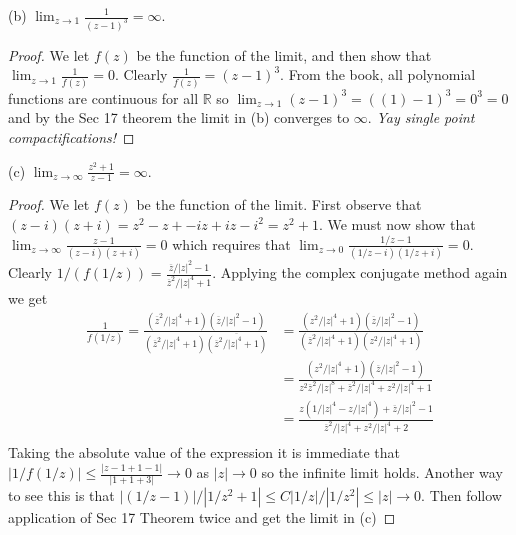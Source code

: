 \documentclass[11pt]{amsart}
\theoremstyle{definition}
\numberwithin{theorem}{section}
\numberwithin{definition}{section}
\numberwithin{equation}{section}
\begin{document}
\noindent (b) $\lim_{z \to 1} \frac{1}{(z-1)^3} = \infty$.
\begin{proof}
  We let $f(z)$ be the function of the limit, and then show that $\lim_{z \to 1} \frac{1}{f(z)} = 0.$ Clearly $\frac{1}{f(z)} = (z-1)^3$. From the book, all polynomial functions are continuous for all $\mathbb{R}$ so $\lim_{z \to 1}(z-1)^3 = ((1)-1)^3 = 0^3 = 0$ and by the Sec 17 theorem the limit in (b) converges to $\infty.$ \emph{Yay single point compactifications!}
\end{proof}


\noindent (c) $\lim_{z \to \infty} \frac{z^2 + 1}{z-1} = \infty$.
\begin{proof}
  We let $f(z)$ be the function of the limit. First observe that $(z-i)(z+i) = z^2 - z + -iz +iz -i^2 = z^2 + 1$. We must now show that $\lim_{z \to \infty} \frac{z-1}{(z-i)(z+i)} = 0$ which requires that $\lim_{z \to 0}\frac{1/z -1}{(1/z-i)(1/z + i)} =0$. Clearly $1/(f(1/z)) = \frac{\overline{z}/|z|^2 - 1}{\overline{z}^2/|z|^4 + 1}.$ Applying the complex conjugate method again we get
  \begin{equation*}
  \begin{aligned}
    \frac{1}{f(1/z)} = \frac{(\overline{z}^2/|z|^4 + 1)(\overline{z}/|z|^2 - 1)}{(\overline{z}^2/|z|^4 + 1)\overline{(\overline{z}^2/|z|^4 + 1)}}   &= \frac{(z^2/|z|^4 + 1)(\overline{z}/|z|^2 - 1)}{(\overline{z}^2/|z|^4 + 1)(z^2/|z|^4 + 1)} \\
    &= \frac{(z^2/|z|^4 + 1)(\overline{z}/|z|^2 - 1)}{z^2\overline{z}^2/|z|^8 + \overline{z}^2/|z|^4 + z^2/|z|^4 + 1} \\
     &= \frac{z(1/|z|^4 - z/|z|^4) + \overline{z}/|z|^2 -1}{\overline{z}^2/|z|^4 + z^2/|z|^4 + 2} \\
  \end{aligned}
  \end{equation*}
  Taking the absolute value of the expression it is immediate that $|1/f(1/z)| \leq \frac{|z - 1 + 1 -1|}{|1 + 1 + 3|} \to 0$ as $|z| \to 0$ so the infinite limit holds. Another way to see this is that $|(1/z-1)|/|1/z^2 + 1| \leq C|1/z|/|1/z^2| \leq |z| \to 0$. Then follow application of Sec 17 Theorem twice and get the limit in (c)
\end{proof}
\end{document}
